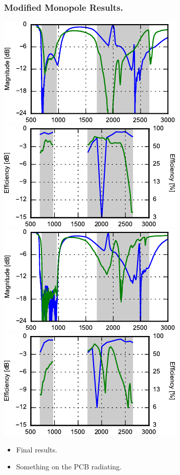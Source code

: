 \begin{frame}
  \frametitle{Modified Monopole Results.}
\begin{center}
    \includegraphics{img/Lasse/tuner_pcb/002_s11top.pdf}
    \includegraphics{img/Lasse/tuner_pcb/002_efftop.pdf} \\
    \includegraphics{img/Lasse/tuner_pcb/002_s22side.pdf}
    \includegraphics{img/Lasse/tuner_pcb/002_effside.pdf}
\end{center}
      \begin{itemize}
      \item Final results.
      \item Something on the PCB radiating.
      \end{itemize}
\legendfooter
\end{frame}
\def\legendfooter{\scriptsize{Upper: Top antenna. Lower: Side antenna. \textcolor{bb}{Monopole without cap}, \textcolor{gg}{Monopole with cap}, Frequency in MHz.}}
\def\emptyline{\textcolor{white}{Empty}}

